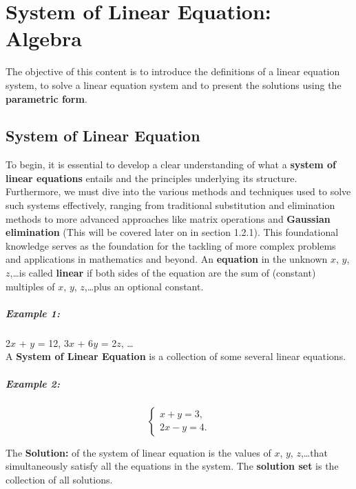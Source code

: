 \documentclass[a4paper,12pt]{article}
\begin{document}
\Large \section{System of Linear Equation: Algebra}
\small The objective of this content is to introduce the definitions of a linear equation system, to solve a linear equation system and to present the solutions using the \textbf{parametric form}.
\Large \subsection{System of  Linear Equation}
    \begin{frame}
        \small
        
        \small To begin, it is essential to develop a clear understanding of what a \textbf{ system of linear equations} entails and the principles underlying its structure. Furthermore, we must dive into the various methods and techniques used to solve such systems effectively, ranging from traditional substitution and elimination methods to more advanced approaches like matrix operations and \textbf{Gaussian elimination} (This will be covered later on in section 1.2.1). This foundational knowledge serves as the foundation for the tackling of more complex problems and applications in mathematics and beyond.
        \small An \textbf{ equation} in the unknown \(x\), \(y\), \(z\),\dots is called \textbf{linear} if both sides of the equation are the sum of (constant) multiples of \(x\), \(y\), \(z\),\dots plus an optional constant.

        
        \subparagraph{Example 1:} 2\(x\) + \(y\) = 12, 3\(x\) + 6\(y\) = 2\(z\), \dots\\

        
        A \textbf{System of Linear Equation} is a collection of some several linear equations.


        \subparagraph{Example 2:}
        \begin{center}
            \begin{equation}
            \begin{cases}
                x + y = 3, \\
                2x - y = 4.
            \end{cases}
            \end{equation}
        \end{center}

        The \textbf{Solution:} of the system of linear equation is the values of \(x\), \(y\), \(z\),\dots that simultaneously satisfy all the equations in the system. The \textbf{solution set} is the collection of all solutions.\\


\end{frame}
\end{document}
